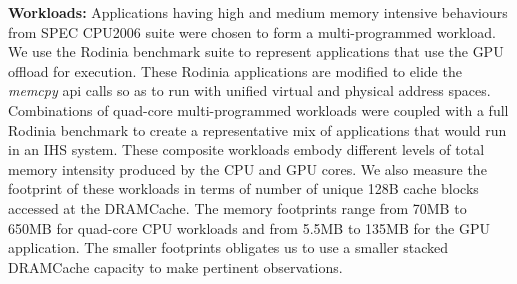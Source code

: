 \par \textbf{Workloads:} Applications having high and medium memory intensive behaviours from SPEC CPU2006 suite \cite{spec2006} were chosen to form a multi-programmed workload. We use the Rodinia benchmark suite \cite{rodinia} to represent applications that use the GPU offload for execution. These Rodinia applications are modified to elide the \textit{memcpy} api calls so as to run with unified virtual and physical address spaces. Combinations of quad-core multi-programmed workloads were coupled with a full Rodinia benchmark to create a representative mix of applications that would run in an IHS system. These composite workloads embody different levels of total memory intensity produced by the CPU and GPU cores. We also measure the footprint of these workloads in terms of number of unique 128B cache blocks accessed at the DRAMCache. The memory footprints range from 70MB to 650MB for quad-core CPU workloads and from 5.5MB to 135MB for the GPU application. The smaller footprints obligates us to use a smaller stacked DRAMCache capacity to make pertinent observations.\\

